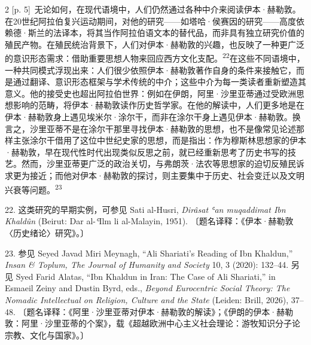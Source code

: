\documentclass[10pt,a4paper]{article}
\begin{document}
\begin{paracol}{2}
{\scriptsize\color{gray} [p. 5]}\ 无论如何，在现代语境中，人们仍然通过各种中介来阅读伊本·赫勒敦。在20世纪阿拉伯复兴运动期间，对他的研究——如塔哈·侯赛因的研究——高度依赖德·斯兰的法译本，将其当作阿拉伯语文本的替代品，而非具有独立研究价值的殖民产物。在殖民统治背景下，人们对伊本·赫勒敦的兴趣，也反映了一种更广泛的意识形态需求：借助重要思想人物来回应西方文化支\mbox{配。\textsuperscript{22}}在这些不同语境中，一种共同模式浮现出来：人们很少依照伊本·赫勒敦著作自身的条件来接触它，而是通过翻译、意识形态框架与学术传统的中介；这些中介为每一类读者重新塑造其意义。他的接受史也超出阿拉伯世界：例如在伊朗，阿里·沙里亚蒂通过受欧洲思想影响的范畴，将伊本·赫勒敦读作历史哲学家。在他的解读中，人们更多地是在伊本·赫勒敦身上遇见埃米尔·涂尔干，而非在涂尔干身上遇见伊本·赫勒敦。换言之，沙里亚蒂不是在涂尔干那里寻找伊本·赫勒敦的思想，也不是像常见论述那样主张涂尔干借用了这位中世纪史家的思想，而是指出：作为穆斯林思想家的伊本·赫勒敦，早在现代性时代出现类似反思之前，就已经重新思考了历史书写的技艺。然而，沙里亚蒂更广泛的政治关切，与弗朗茨·法农等思想家的迫切反殖民诉求更为接近；而他对伊本·赫勒敦的探讨，则主要集中于历史、社会变迁以及文明兴衰等问\mbox{题。\textsuperscript{23}}\par{\small 22. 这类研究的早期实例，可参见 Sati al-Husri, \textit{Dirâsat ʿan muqaddimat Ibn Khaldûn} (Beirut: Dar al-\textit{ʿ}Ilm li al-Malayin, 1951). 〔题名译释：《伊本·赫勒敦〈历史绪论〉研究》。〕\par}{\small 23. 参见 Seyed Javad Miri Meynagh, “Ali Shariati’s Reading of Ibn Khaldun,” \textit{Insan \& Toplum, The Journal of Humanity and Society} 10, 3 (2020): 132–44. 另见 Syed Farid Alatas, “Ibn Khaldun in Iran: The Case of Ali Shariati,” in Esmaeil Zeiny and Dustin Byrd, eds., \textit{Beyond Eurocentric Social Theory: The Nomadic Intellectual on Religion, Culture and the State} (Leiden: Brill, 2026), 37–48. 〔题名译释：《阿里·沙里亚蒂对伊本·赫勒敦的解读》；《伊朗的伊本·赫勒敦：阿里·沙里亚蒂的个案》，载《超越欧洲中心主义社会理论：游牧知识分子论宗教、文化与国家》。〕\par}
\switchcolumn

\end{paracol}
\end{document}
